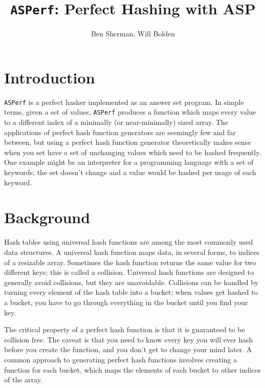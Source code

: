 \documentclass{article}
\title{\texttt{ASPerf}: Perfect Hashing with ASP}
\author{Ben Sherman, Will Bolden}
\begin{document}
\maketitle

\section{Introduction}
\texttt{ASPerf} is a perfect hasher implemented as an answer set program. In simple terms, given a set of values, \texttt{ASPerf} produces a function which maps every value to a different index of a minimally (or near-minimally) sized array. The applications of perfect hash function generators are seemingly few and far between, but using a perfect hash function generator theoretically makes sense when you set have a set of unchanging values which need to be hashed frequently. One example might be an interpreter for a programming language with a set of keywords; the set doesn't change and a value would be hashed per usage of each keyword.

\section{Background}
Hash tables using universal hash functions are among the most commonly used data structures. A universal hash function maps data, in several forms, to indices of a resizable array. Sometimes the hash function returns the same value for two different keys; this is called a collision. Universal hash functions are designed to generally avoid collisions, but they are unavoidable. Collisions can be handled by turning every element of the hash table into a bucket; when values get hashed to a bucket, you have to go through everything in the bucket until you find your key.

The critical property of a perfect hash function is that it is guaranteed to be collision free. The caveat is that you need to know every key you will ever hash before you create the function, and you don't get to change your mind later. A common approach to generating perfect hash functions involves creating a function for each bucket, which maps the elements of each bucket to other indices of the array.
\end{document}
